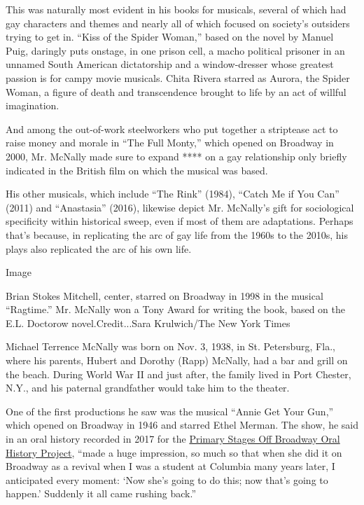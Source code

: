 This was naturally most evident in his books for musicals, several of
which had gay characters and themes and nearly all of which focused on
society's outsiders trying to get in. ``Kiss of the Spider Woman,''
based on the novel by Manuel Puig, daringly puts onstage, in one prison
cell, a macho political prisoner in an unnamed South American
dictatorship and a window-dresser whose greatest passion is for campy
movie musicals. Chita Rivera starred as Aurora, the Spider Woman, a
figure of death and transcendence brought to life by an act of willful
imagination.

And among the out-of-work steelworkers who put together a striptease act
to raise money and morale in ``The Full Monty,'' which opened on
Broadway in 2000, Mr. McNally made sure to expand **** on a gay
relationship only briefly indicated in the British film on which the
musical was based.

His other musicals, which include ``The Rink'' (1984), ``Catch Me if You
Can'' (2011) and ``Anastasia'' (2016), likewise depict Mr. McNally's
gift for sociological specificity within historical sweep, even if most
of them are adaptations. Perhaps that's because, in replicating the arc
of gay life from the 1960s to the 2010s, his plays also replicated the
arc of his own life.

Image

Brian Stokes Mitchell, center, starred on Broadway in 1998 in the
musical ``Ragtime.'' Mr. McNally won a Tony Award for writing the book,
based on the E.L. Doctorow novel.Credit...Sara Krulwich/The New York
Times

Michael Terrence McNally was born on Nov. 3, 1938, in St. Petersburg,
Fla., where his parents, Hubert and Dorothy (Rapp) McNally, had a bar
and grill on the beach. During World War II and just after, the family
lived in Port Chester, N.Y., and his paternal grandfather would take him
to the theater.

One of the first productions he saw was the musical ``Annie Get Your
Gun,'' which opened on Broadway in 1946 and starred Ethel Merman. The
show, he said in an oral history recorded in 2017 for the
\href{http://primarystagesoffcenter.org/interviews/k-o/terrence-mcnally}{Primary
Stages Off Broadway Oral History Project}, ``made a huge impression, so
much so that when she did it on Broadway as a revival when I was a
student at Columbia many years later, I anticipated every moment: `Now
she's going to do this; now that's going to happen.' Suddenly it all
came rushing back.''

